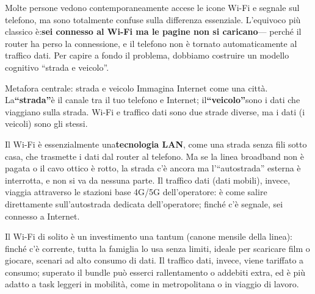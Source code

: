 


Molte persone vedono contemporaneamente accese le icone Wi-Fi e segnale sul telefono, ma sono totalmente confuse sulla differenza essenziale. L'equivoco più classico è:\textbf{sei connesso al Wi-Fi ma le pagine non si caricano}— perché il router ha perso la connessione, e il telefono non è tornato automaticamente al traffico dati. Per capire a fondo il problema, dobbiamo costruire un modello cognitivo “strada e veicolo”.

\begin{tcbinfo}{Metafora centrale: strada e veicolo}
Immagina Internet come una città. La\textbf{“strada”}è il canale tra il tuo telefono e Internet; il\textbf{“veicolo”}sono i dati che viaggiano sulla strada. Wi-Fi e traffico dati sono due strade diverse, ma i dati (i veicoli) sono gli stessi.

\end{tcbinfo}


Il Wi-Fi è essenzialmente una\textbf{tecnologia LAN}, come una strada senza fili sotto casa, che trasmette i dati dal router al telefono. Ma se la linea broadband non è pagata o il cavo ottico è rotto, la strada c'è ancora ma l'“autostrada” esterna è interrotta, e non si va da nessuna parte. Il traffico dati (dati mobili), invece, viaggia attraverso le stazioni base 4G/5G dell'operatore: è come salire direttamente sull'autostrada dedicata dell'operatore; finché c'è segnale, sei connesso a Internet.


Il Wi-Fi di solito è un investimento una tantum (canone mensile della linea): finché c'è corrente, tutta la famiglia lo usa senza limiti, ideale per scaricare film o giocare, scenari ad alto consumo di dati. Il traffico dati, invece, viene tariffato a consumo; superato il bundle può esserci rallentamento o addebiti extra, ed è più adatto a task leggeri in mobilità, come in metropolitana o in viaggio di lavoro.

